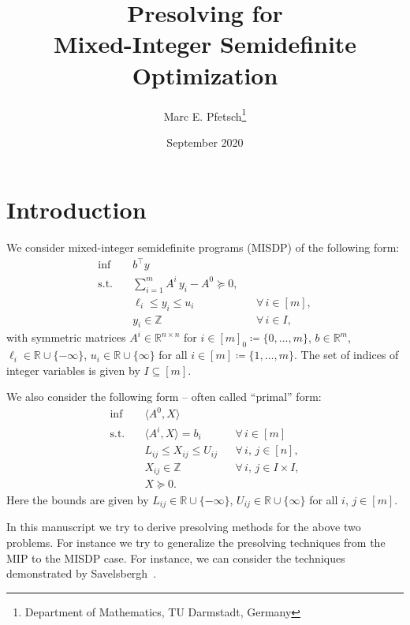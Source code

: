 \documentclass[10pt, a4paper]{article}
\title{Presolving for\\ Mixed-Integer Semidefinite Optimization}
\author{Marc E. Pfetsch\thanks{Department of Mathematics, TU Darmstadt, Germany}}
\date{September 2020}
\newcommand{\define}{\coloneqq}
\newcommand{\skal}[2]{\langle{#1},{#2}\rangle}
\newcommand{\T}{^{\top}}
\newcommand{\R}{\mathds{R}}
\newcommand{\Z}{\mathds{Z}}
\begin{document}
\maketitle


\section{Introduction}

We consider mixed-integer semidefinite programs (MISDP) of the following
form:
\begin{equation}\label{MISDP}
  \begin{aligned}
    \inf \quad & b\T y \\
    \text{s.t.} \quad & \sum_{i=1}^m A^i\, y_i - A^0 \succeq 0, \\
    & \ell_i \leq y_i \leq u_i && \forall\, i \in [m], \\
    & y_i \in \Z && \forall\, i \in I,
  \end{aligned}
\end{equation}
with symmetric matrices $A^i \in \R^{n \times n}$ for
$i \in [m]_0 \define \{0, \dots, m\}$, $b \in \R^m$,
$\ell_i \in \R \cup \{- \infty\}$, $u_i \in \R \cup \{\infty\}$ for all
$i \in [m] \define \{1, \dots, m\}$. The set of indices of integer
variables is given by $I \subseteq [m]$.

We also consider the following form -- often called ``primal'' form:
\begin{equation}\label{MISDP-P}
  \begin{aligned}
    \inf \quad & \skal{A^0}{X} \\
    \text{s.t.} \quad & \skal{A^i}{X} = b_i && \forall\, i \in [m] \\
    & L_{ij} \leq X_{ij} \leq U_{ij} && \forall\, i,\,j \in [n], \\
    & X_{ij} \in \Z && \forall\, i,\,j \in I \times I,\\
    & X \succeq 0.
  \end{aligned}
\end{equation}
Here the bounds are given by $L_{ij} \in \R \cup \{- \infty\}$, $U_{ij} \in \R \cup \{\infty\}$ for all
$i$, $j \in [m]$.

In this manuscript we try to derive presolving methods for the above two
problems. For instance we try to generalize the presolving techniques from
the MIP to the MISDP case. For instance, we can consider the techniques
demonstrated by Savelsbergh~\cite{Sav94}.
\end{document}
